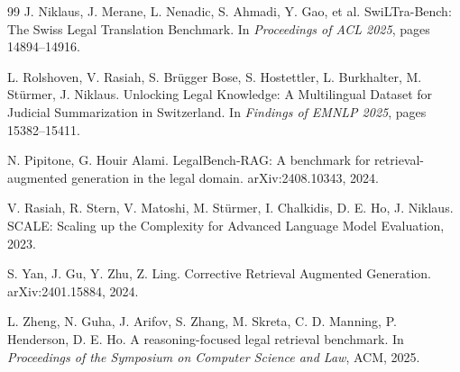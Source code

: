 \documentclass[11pt,a4paper]{article}
\begin{document}
\begin{thebibliography}{99}
J. Niklaus, J. Merane, L. Nenadic, S. Ahmadi, Y. Gao, et al.
\newblock SwiLTra-Bench: The Swiss Legal Translation Benchmark.
\newblock In \emph{Proceedings of ACL 2025}, pages 14894--14916.

L. Rolshoven, V. Rasiah, S. Br{\"u}gger Bose, S. Hostettler, L. Burkhalter, M. St{\"u}rmer, J. Niklaus.
\newblock Unlocking Legal Knowledge: A Multilingual Dataset for Judicial Summarization in Switzerland.
\newblock In \emph{Findings of EMNLP 2025}, pages 15382--15411.

N. Pipitone, G. Houir Alami.
\newblock LegalBench-RAG: A benchmark for retrieval-augmented generation in the legal domain.
\newblock arXiv:2408.10343, 2024.

V. Rasiah, R. Stern, V. Matoshi, M. Stürmer, I. Chalkidis, D. E. Ho, J. Niklaus.
\newblock SCALE: Scaling up the Complexity for Advanced Language Model Evaluation, 2023.

S. Yan, J. Gu, Y. Zhu, Z. Ling.
\newblock Corrective Retrieval Augmented Generation.  arXiv:2401.15884, 2024.

L. Zheng, N. Guha, J. Arifov, S. Zhang, M. Skreta, C. D. Manning, P. Henderson, D. E. Ho.
\newblock A reasoning-focused legal retrieval benchmark.
\newblock In \emph{Proceedings of the Symposium on Computer Science and Law}, ACM, 2025.

\end{thebibliography}
\end{document}
